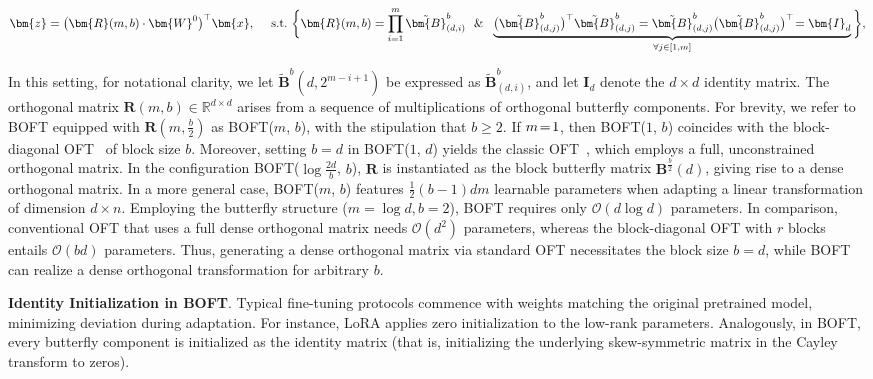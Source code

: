 \begin{equation}
    \begin{aligned}\nonumber
    \bm{z}=\big(\bm{R}(m,b)\cdot\bm{W}^0\big)^\top\bm{x},~~~~\text{s.t.}~\bigg{\{}\bm{R}(m,b)=\prod_{i=1}^m \tilde{\bm{B}}^b_{(d,i)}~~\&~~\underbrace{\big(\tilde{\bm{B}}^b_{(d,j)}\big)^\top\tilde{\bm{B}}^b_{(d,j)}=\tilde{\bm{B}}^b_{(d,j)}\big(\tilde{\bm{B}}^b_{(d,j)}\big)^\top\!=\bm{I}_d}_{\forall j\in [1, m]}\bigg{\}},
    \end{aligned}
\end{equation}

In this setting, for notational clarity, we let $\tilde{\bm{B}}^b(d,2^{m - i+1})$ be expressed as $\tilde{\bm{B}}^b_{(d,i)}$, and let $\bm{I}_d$ denote the $d \times d$ identity matrix. The orthogonal matrix $\bm{R}(m,b) \in \mathbb{R}^{d \times d}$ arises from a sequence of multiplications of orthogonal butterfly components. For brevity, we refer to BOFT equipped with $\bm{R}(m,\frac{b}{2})$ as BOFT($m$, $b$), with the stipulation that $b \geq 2$. If $\thickmuskip=2mu \medmuskip=2mu m=1$, then BOFT($1$, $b$) coincides with the block-diagonal OFT~\cite{qiu2023controlling} of block size $b$. Moreover, setting $b=d$ in BOFT($1$, $d$) yields the classic OFT~\cite{qiu2023controlling}, which employs a full, unconstrained orthogonal matrix. In the configuration BOFT($\log \frac{2d}{b}$, $b$), $\bm{R}$ is instantiated as the block butterfly matrix $\bm{B}^{\frac{b}{2}}(d)$, giving rise to a dense orthogonal matrix. In a more general case, BOFT($m$, $b$) features $\frac{1}{2}(b-1)dm$ learnable parameters when adapting a linear transformation of dimension $d\times n$. Employing the butterfly structure ($m = \log d, b=2$), BOFT requires only $\mathcal{O}(d\log d)$ parameters. In comparison, conventional OFT that uses a full dense orthogonal matrix needs $\mathcal{O}(d^2)$ parameters, whereas the block-diagonal OFT with $r$ blocks entails $\mathcal{O}(bd)$ parameters. Thus, generating a dense orthogonal matrix via standard OFT necessitates the block size $b=d$, while BOFT can realize a dense orthogonal transformation for arbitrary $b$.

\textbf{Identity Initialization in BOFT}. Typical fine-tuning protocols commence with weights matching the original pretrained model, minimizing deviation during adaptation. For instance, LoRA applies zero initialization to the low-rank parameters. Analogously, in BOFT, every butterfly component is initialized as the identity matrix (that is, initializing the underlying skew-symmetric matrix in the Cayley transform to zeros).

